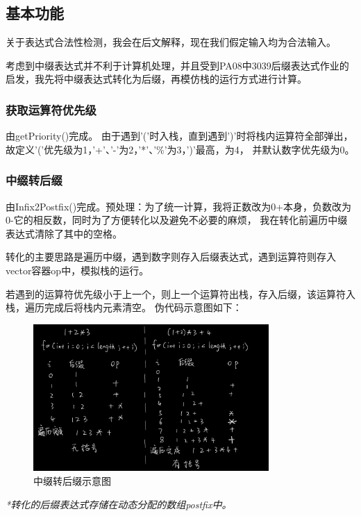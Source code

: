 \documentclass[a4paper, 11pt, UTF8]{ctexart}
\begin{document}
\subsection{基本功能}

关于表达式合法性检测，我会在后文解释，现在我们假定输入均为合法输入。

考虑到中缀表达式并不利于计算机处理，并且受到PA08中3039后缀表达式作业的启发，我先将中缀表达式转化为后缀，再模仿栈的运行方式进行计算。

\subsubsection{获取运算符优先级}

由getPriority()完成。
由于遇到'('时入栈，直到遇到')'时将栈内运算符全部弹出，故定义'('优先级为1，'+'、'-'为2，'*'、'\%'为3，')'最高，为4，
并默认数字优先级为0。

\subsubsection{中缀转后缀}

由Infix2Postfix()完成。预处理：为了统一计算，我将正数改为0+本身，负数改为0-它的相反数，同时为了方便转化以及避免不必要的麻烦，
我在转化前遍历中缀表达式清除了其中的空格。

转化的主要思路是遍历中缀，遇到数字则存入后缀表达式，遇到运算符则存入vector容器op中，模拟栈的运行。

若遇到的运算符优先级小于上一个，则上一个运算符出栈，存入后缀，该运算符入栈，遍历完成后将栈内元素清空。
伪代码示意图如下：

\begin{figure}[H]
    \centering
    \includegraphics[width=0.8\textwidth]{infix2postfix.jpg}
    \caption{中缀转后缀示意图}
\end{figure}

\textit{*转化的后缀表达式存储在动态分配的数组postfix中。}
\end{document}
